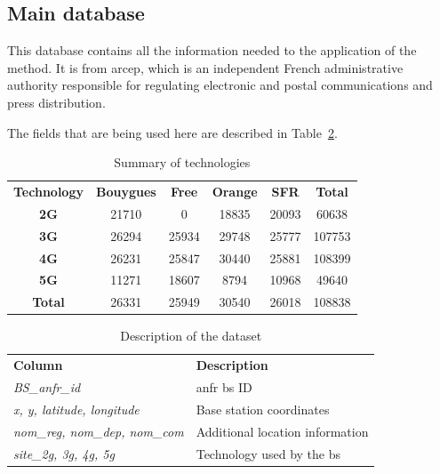 \documentclass[lettersize,journal,english]{IEEEtran}
\begin{document}
    \subsection{Main database}
    This database \cite{main_database} contains all the information needed to the application of the method. It is from
    \acrfull{arcep}, which is an independent French administrative authority responsible for regulating electronic and postal communications and press distribution.

    The fields that are being used here are described in Table~\ref{table:data_columns}.

    \begin{table}[!t]
        \centering
        \caption{Summary of technologies}
        \label{table:techno_numbers}
        \begin{tabular}{cccccc}
            \toprule
            \textbf{Technology} & \textbf{Bouygues} & \textbf{Free} & \textbf{Orange} & \textbf{SFR} & \textbf{Total} \\
            \cmidrule(lr){1-6}
            \textbf{2G} & 21710 & 0 & 18835 & 20093 & 60638 \\
            \textbf{3G} & 26294 & 25934 & 29748 & 25777 & 107753 \\
            \textbf{4G} & 26231 & 25847 & 30440 & 25881 & 108399 \\
            \textbf{5G} & 11271 & 18607 & 8794 & 10968 & 49640 \\
            \textbf{Total} & 26331 & 25949 & 30540 & 26018 & 108838 \\
            \bottomrule
        \end{tabular}
    \end{table}

\begin{table}[!b]
    \centering
    \caption{Description of the dataset}
    \label{table:data_columns}
    \begin{tabular}{ll}
        \toprule
        \textbf{Column} & \textbf{Description} \\
        \cmidrule(lr){1-2}
        \textsl{BS\_anfr\_id} & \acrshort{anfr} \acrshort{bs} ID \\ 
        \textsl{x, y, latitude, longitude} & Base station coordinates \\ 
        \textsl{nom\_reg, nom\_dep, nom\_com} & Additional location information \\  
        \textsl{site\_2g, 3g, 4g, 5g} & Technology used by the \acrshort{bs} \\ 
        \bottomrule
    \end{tabular}
\end{table}
\end{document}
